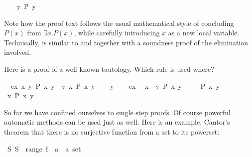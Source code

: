 \begin{isabellebody}
\isanewline
\ \ \isamarkupfalse%
\ {\isachardoublequoteopen}{\isasymexists}y{\isachardot}\ P\ y{\isachardoublequoteclose}\ \isacommand{{\isachardot}{\isachardot}}\isamarkupfalse%
\isanewline
{}\isamarkupfalse%
%
\endisatagproof
{\isafoldproof}%
%
\isadelimproof
%
\endisadelimproof
%
\begin{isamarkuptext}%
\noindent Note how the proof text follows the usual mathematical style
of concluding $P(x)$ from $\exists x. P(x)$, while carefully introducing $x$
as a new local variable.  Technically,  is similar to
 and  together with a soundness proof of
the elimination involved.

Here is a proof of a well known tautology.
Which rule is used where?%
\end{isamarkuptext}%
\isamarkuptrue%
\isamarkupfalse%
\ \ ex{\isacharcolon}\ {\isachardoublequoteopen}{\isasymexists}x{\isachardot}\ {\isasymforall}y{\isachardot}\ P\ x\ y{\isachardoublequoteclose}\ \ {\isachardoublequoteopen}{\isasymforall}y{\isachardot}\ {\isasymexists}x{\isachardot}\ P\ x\ y{\isachardoublequoteclose}\isanewline
%
\isadelimproof
%
\endisadelimproof
%
\isatagproof
{}\isamarkupfalse%
\isanewline
\ \ \isamarkupfalse%
\ y\isanewline
\ \ \isamarkupfalse%
\ ex\ \isamarkupfalse%
\ x\ \ {\isachardoublequoteopen}{\isasymforall}y{\isachardot}\ P\ x\ y{\isachardoublequoteclose}\ \isacommand{{\isachardot}{\isachardot}}\isamarkupfalse%
\isanewline
\ \ \isamarkupfalse%
\ {\isachardoublequoteopen}P\ x\ y{\isachardoublequoteclose}\ \isacommand{{\isachardot}{\isachardot}}\isamarkupfalse%
\isanewline
\ \ \isamarkupfalse%
\ {\isachardoublequoteopen}{\isasymexists}x{\isachardot}\ P\ x\ y{\isachardoublequoteclose}\ \isacommand{{\isachardot}{\isachardot}}\isamarkupfalse%
\isanewline
{}\isamarkupfalse%
%
\endisatagproof
{\isafoldproof}%
%
\isadelimproof
%
\endisadelimproof
%
\isamarkuptrue%
%
\begin{isamarkuptext}%
So far we have confined ourselves to single step proofs. Of course
powerful automatic methods can be used just as well. Here is an example,
Cantor's theorem that there is no surjective function from a set to its
powerset:%
\end{isamarkuptext}%
\isamarkuptrue%
\isamarkupfalse%
\ {\isachardoublequoteopen}{\isasymexists}S{\isachardot}\ S\ {\isasymnotin}\ range\ {\isacharparenleft}f\ {\isacharcolon}{\isacharcolon}\ {\isacharprime}a\ {\isasymRightarrow}\ {\isacharprime}a\ set{\isacharparenright}{\isachardoublequoteclose}\isanewline

\end{isabellebody}
